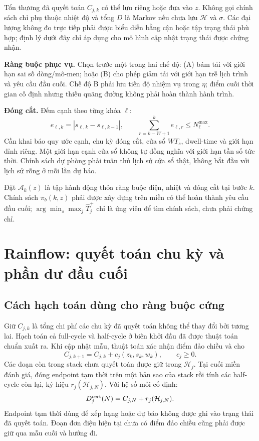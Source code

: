 \documentclass[11pt,a4paper]{article}
\begin{document}
Tổn thương đã quyết toán $C_{j,k}$ có thể lưu riêng hoặc đưa vào $z$. Không gọi chính sách chỉ phụ thuộc nhiệt độ và tổng $D$ là Markov nếu chưa lưu $\mathcal H$ và $\sigma$. Các đại lượng không đo trực tiếp phải được biểu diễn bằng cận hoặc tập trạng thái phù hợp; định lý dưới đây chỉ áp dụng cho mô hình cập nhật trạng thái được chứng nhận.

\textbf{Ràng buộc phục vụ.} Chọn trước một trong hai chế độ: (A) bám tải với giới hạn sai số dòng/mô-men; hoặc (B) cho phép giảm tải với giới hạn trễ lịch trình và yêu cầu đầu cuối. Chế độ B phải lưu tiến độ nhiệm vụ trong $\eta$; điểm cuối thời gian cố định nhưng thiếu quãng đường không phải hoàn thành hành trình.

\textbf{Đóng cắt.} Đếm cạnh theo từng khóa $\ell$:
\[
e_{\ell,k}=|s_{\ell,k}-s_{\ell,k-1}|,\qquad
\sum_{r=k-W+1}^{k}e_{\ell,r}\le N_{\ell}^{\max}.
\]
Cần khai báo quy ước cạnh, chu kỳ đóng cắt, cửa sổ $WT_s$, dwell-time và giới hạn đỉnh riêng. Một giới hạn cạnh cửa sổ không tự đồng nghĩa với giới hạn tần số tức thời. Chính sách dự phòng phải tuân thủ lịch sử cửa sổ thật, không bắt đầu với lịch sử rỗng ở mỗi lần dự báo.

Đặt $\mathcal A_k(z)$ là tập hành động thỏa ràng buộc điện, nhiệt và đóng cắt tại bước $k$. Chính sách $\pi_b(k,z)$ phải được xây dựng trên miền có thể hoàn thành yêu cầu đầu cuối; $\arg\min_s\max_j\hat T_j^+$ chỉ là ứng viên để tìm chính sách, chưa phải chứng chỉ.

\section{Rainflow: quyết toán chu kỳ và phần dư đầu cuối}
\subsection{Cách hạch toán dùng cho ràng buộc cứng}
Giữ $C_{j,k}$ là tổng chi phí các chu kỳ đã quyết toán không thể thay đổi bởi tương lai. Hạch toán cả full-cycle và half-cycle ở biên khởi đầu đã được thuật toán chuẩn xuất ra. Khi cập nhật mẫu, thuật toán xác nhận điểm đảo chiều và cho
\[
C_{j,k+1}=C_{j,k}+c_j(z_k,s_k,w_k),\qquad c_j\ge0.
\]
Các đoạn còn trong stack chưa quyết toán được giữ trong $\mathcal H_j$. Tại cuối miền đánh giá, đóng endpoint tạm thời trên một bản sao của stack rồi tính các half-cycle còn lại, ký hiệu $r_j(\mathcal H_{j,N})$. Với hệ số mỏi cố định:
\[
D_j^{\rm cert}(N)=C_{j,N}+r_j(\mathcal H_{j,N}).
\]
Endpoint tạm thời dùng để xếp hạng hoặc dự báo không được ghi vào trạng thái đã quyết toán. Đoạn đơn điệu hiện tại chưa có điểm đảo chiều cũng phải được giữ qua mẫu cuối và hướng đi.
\end{document}
